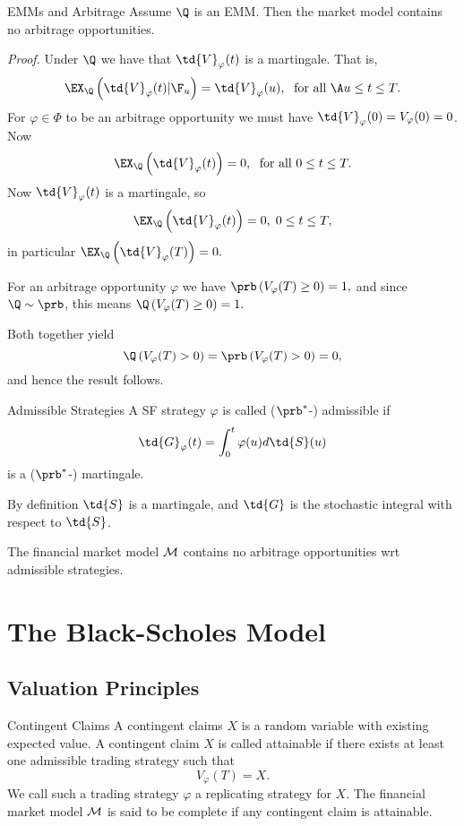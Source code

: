 EMMs and Arbitrage
	Assume $\Q$ is an EMM. Then the market model contains no arbitrage
	opportunities.

	{\it Proof.} Under $\Q$ we have that $\td{V}_\varphi(t)$ is a
	martingale. That is,
		$$
		\EX_{\Q}\left(\td{V}_\varphi(t)|\F_u\right) = \td{V}_\varphi(u),\;
		\mbox{ for all }\A u \leq t \leq T.
		$$
	For $\varphi \in \Phi$ to be an arbitrage opportunity we must have
	$\td{V}_\varphi(0) =V_\varphi(0)= 0$.  Now
		$$
		\EX_{\Q}\left(\td{V}_\varphi(t)\right) = 0,\; \mbox{ for all } 0
		\leq t \leq T.
		$$
	Now $\td{V}_\varphi(t)$ is a martingale, so
		$$
		\EX_{\Q}\left(\td{V}_\varphi(t)\right) = 0,\; 0 \leq t \leq T,
		$$
	in particular $ \EX_{\Q}\left(\td{V}_\varphi(T)\right) = 0. $

	For an arbitrage opportunity $\varphi$ we have $
	\prb\left(V_\varphi(T) \geq 0\right) =1, $ and since $\Q \sim
	\prb$, this means $ \Q\left(V_\varphi(T) \geq 0\right) =1. $

	Both together yield
		$$
		\Q\left(V_\varphi(T) > 0\right) = \prb\left(V_\varphi(T) >
		0\right) =0,
		$$
	and hence the result follows.\hfill \eb


Admissible Strategies
	A SF strategy $\varphi$ is called ($\prb^*$-) admissible if
		$$
		\td{G}_\varphi(t) = \int_0^t \varphi(u) d\td{S}(u)
		$$
	is a ($\prb^*$-) martingale.
  
	By definition $\td{S}$ is a martingale, and $\td{G}$ is the
	stochastic integral with respect to $\td{S}$.
  
	The financial market model $\cal M$ contains no arbitrage
	opportunities wrt admissible strategies.



\section{The Black-Scholes Model}
\subsection{Valuation Principles}

Contingent Claims
	A contingent claims $X$ is a random variable with existing expected value. 
		A contingent claim $X$ is called attainable if there
		exists at least one admissible trading strategy such that
			$$
			V_\varphi(T) = X.
			$$
		We call such a  trading strategy $\varphi$ a replicating strategy
		for $X$.  The financial market model ${\cal M}$ is said
		to be complete if any contingent claim is attainable.


